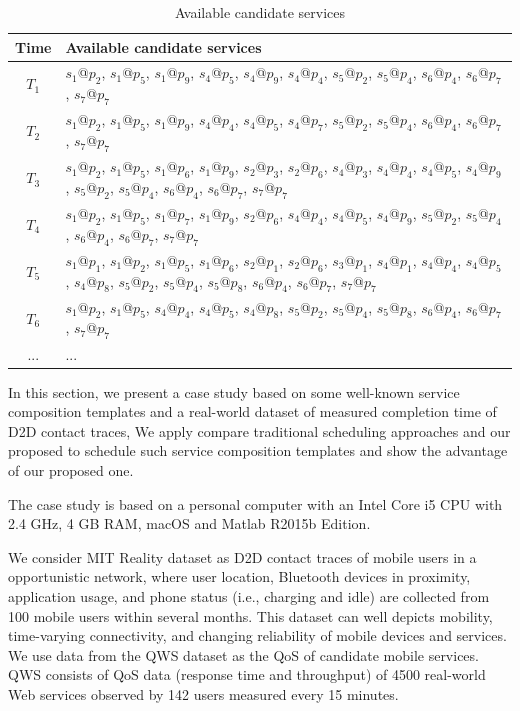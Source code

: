 \documentclass[journal]{IEEEtran}
\begin{document}
\begin{table}[!t]
\renewcommand{\arraystretch}{1.5}
\caption{Available candidate services}
\label{Available candidate services}
\centering
\begin{tabular}{c l}
\hline
\bfseries Time & \bfseries Available candidate services\\
\hline
$T_1$     & $s_1$@$p_2$, $s_1$@$p_5$, $s_1$@$p_9$, $s_4$@$p_5$, $s_4$@$p_9$, $s_4$@$p_4$, $s_5$@$p_2$, $s_5$@$p_4$, $s_6$@$p_4$, $s_6$@$p_7$, $s_7$@$p_7$ \\
$T_2$     & $s_1$@$p_2$, $s_1$@$p_5$, $s_1$@$p_9$, $s_4$@$p_4$, $s_4$@$p_5$, $s_4$@$p_7$, $s_5$@$p_2$, $s_5$@$p_4$, $s_6$@$p_4$, $s_6$@$p_7$, $s_7$@$p_7$ \\
$T_3$     & $s_1$@$p_2$, $s_1$@$p_5$, $s_1$@$p_6$, $s_1$@$p_9$, $s_2$@$p_3$, $s_2$@$p_6$, $s_4$@$p_3$, $s_4$@$p_4$, $s_4$@$p_5$, $s_4$@$p_9$, $s_5$@$p_2$, $s_5$@$p_4$, $s_6$@$p_4$, $s_6$@$p_7$, $s_7$@$p_7$ \\
$T_4$     & $s_1$@$p_2$, $s_1$@$p_5$, $s_1$@$p_7$, $s_1$@$p_9$, $s_2$@$p_6$, $s_4$@$p_4$, $s_4$@$p_5$, $s_4$@$p_9$, $s_5$@$p_2$, $s_5$@$p_4$, $s_6$@$p_4$, $s_6$@$p_7$, $s_7$@$p_7$ \\
$T_5$     & $s_1$@$p_1$, $s_1$@$p_2$, $s_1$@$p_5$, $s_1$@$p_6$, $s_2$@$p_1$, $s_2$@$p_6$, $s_3$@$p_1$, $s_4$@$p_1$, $s_4$@$p_4$, $s_4$@$p_5$, $s_4$@$p_8$, $s_5$@$p_2$, $s_5$@$p_4$, $s_5$@$p_8$, $s_6$@$p_4$, $s_6$@$p_7$, $s_7$@$p_7$ \\
$T_6$     & $s_1$@$p_2$, $s_1$@$p_5$, $s_4$@$p_4$, $s_4$@$p_5$, $s_4$@$p_8$, $s_5$@$p_2$, $s_5$@$p_4$, $s_5$@$p_8$, $s_6$@$p_4$, $s_6$@$p_7$, $s_7$@$p_7$ \\
... & ...\\
\hline
\end{tabular}
\end{table}


In this section, we present a case study based on some well-known service composition templates and a real-world dataset of measured completion time of D2D contact traces, We apply compare traditional scheduling approaches and our proposed to schedule such service composition templates and show the advantage of our proposed one.

The case study is based on a personal computer with an Intel Core i5 CPU with 2.4 GHz, 4 GB RAM, macOS and Matlab R2015b Edition.

We consider MIT Reality dataset \cite{eagle2006reality} as D2D contact traces of mobile users in a opportunistic network, where user location, Bluetooth devices in proximity, application usage, and phone status (i.e., charging and idle) are collected from 100 mobile users within several months. This dataset can well depicts mobility, time-varying connectivity, and changing reliability of mobile devices and services. 
We use data from the QWS dataset \cite{zheng2014investigating} as the QoS of candidate mobile services. 
QWS consists of QoS data (response time and throughput) of 4500 real-world Web services observed by 142 users measured every 15 minutes.
\end{document}
